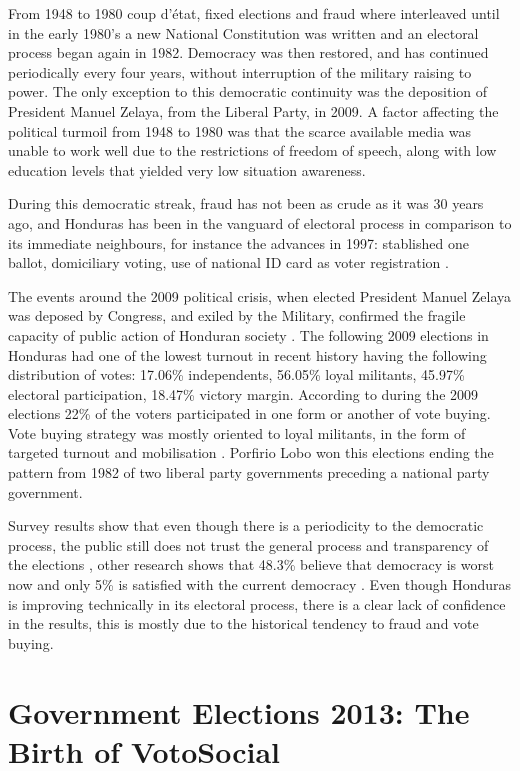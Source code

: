 \documentclass[letterpaper,10pt]{article}
\begin{document}
From 1948 to 1980 coup d'\'{e}tat, fixed elections and fraud where interleaved until in the early 1980's a new National Constitution was written and an electoral process began again in 1982. Democracy was then restored, and has continued periodically every four years, without interruption of the military raising to power. The only exception to this democratic continuity was the deposition of President Manuel Zelaya, from the Liberal Party, in 2009. A factor affecting the political turmoil from 1948 to 1980 was that the scarce available media was unable to work well due to the restrictions of freedom of speech, along with low education levels that yielded very low situation awareness.

During this democratic streak, fraud has not been as crude as it was 30 years ago, and Honduras has been in the vanguard of electoral process in comparison to its immediate neighbours, for instance the advances in 1997: stablished one ballot, domiciliary voting, use of national ID card as voter registration \citep{romero2014}.

The events around the 2009 political crisis, when elected President Manuel Zelaya was deposed by Congress, and exiled by the Military, confirmed the fragile capacity of public action of Honduran society \citep{romero2014}. The following 2009 elections in Honduras had one of the lowest turnout in recent history having the following distribution of votes: 17.06\% independents, 56.05\% loyal militants, 45.97\% electoral participation, 18.47\% victory margin. According to \cite{gonza2014} during the 2009 elections 22\% of the voters participated in one form or another of vote buying. Vote buying strategy was mostly oriented to loyal militants, in the form of targeted turnout and mobilisation \citep{gonza2014}. Porfirio Lobo won this elections ending the pattern from 1982 of two liberal party governments preceding a national party government.

Survey results show that even though there is a periodicity to the democratic process, the public still does not trust the general process and transparency of the elections \citep{romero2014}, other research shows that 48.3\% believe that democracy is worst now and only 5\% is satisfied with the current democracy \citep{latinbar}. Even though Honduras is improving technically in its electoral process, there is a clear lack of confidence in the results, this is mostly due to the historical tendency to fraud and vote buying.

\section{Government Elections 2013: The Birth of VotoSocial}
\end{document}
